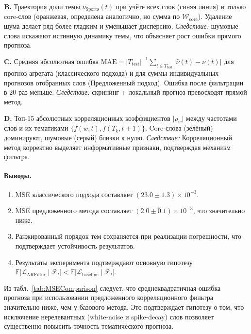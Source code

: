 \documentclass[14pt,a4paper]{article}
\begin{document}
\textbf{B.} Траектория доли темы \(\nu_{\text{Sports}}(t)\)  
при учёте всех слов (синяя линия) и только core-слов (оранжевая, определена аналогично, но сумма по \(\mathcal W_{\mathrm{core}}\)).  
Удаление шума делает ряд более гладким и уменьшает дисперсию.  
\emph{Следствие:} шумовые слова искажают истинную динамику темы, что объясняет рост ошибки прямого прогноза.

\textbf{C.} Средняя абсолютная ошибка  
\(\displaystyle \mathrm{MAE} = \lvert T_{\mathrm{test}}\rvert^{-1}\sum_{t\in T_{\mathrm{test}}}\lvert\widehat{\nu}(t)-\nu(t)\rvert\)  
для прогноз агрегата (классического подхода) и для суммы индивидуальных прогнозов отобранных слов (Предложенный подход).  
Ошибка после фильтрации в \(20\) раз меньше.  
\emph{Следствие:} скрининг + локальный прогноз превосходят прямой метод.

\textbf{D.} Топ-15 абсолютных корреляционных коэффициентов \(\lvert\rho_w\rvert\) между частотами слов и их тематиками \(\{f(w,t),f(T_k,t+1)\}\).  
Core-слова (зелёный) доминируют, шумовые (серый) близки к нулю.  
\emph{Следствие:} Корреляционный метод корректно выделяет информативные признаки, подтверждая механизм фильтра.
\label{fig:hypotheses}


\paragraph{Выводы.}
\begin{enumerate}
\item MSE классического подхода составляет $(23.0\pm1.3)\times10^{-3}$.
\item MSE предложенного метода составляет $(2.0\pm0.1)\times10^{-3}$, что значительно ниже.
\item Ранжированный порядок тем сохраняется при реализации погрешности, что подтверждает устойчивость результатов.
\item Результаты эксперимента подтверждают основную гипотезу \(
  \mathbb{E}\!\bigl[\mathcal L_{\mathrm{ARFilter}}\mid \mathcal{F}_{t}\bigr]
  <
  \mathbb{E}\!\bigl[\mathcal L_{\mathrm{baseline}}\mid \mathcal{F}_{t}\bigr]
\).
\end{enumerate}


Из табл.~\ref{tab:MSEComparison} следует, что среднеквадратичная ошибка прогноза при использовании предложенного корреляционного фильтра значительно ниже, чем у базового метода. Это подтверждает гипотезу о том, что исключение нерелевантных (white-noise и spike-decay) слов позволяет существенно повысить точность тематического прогноза.
\end{document}
